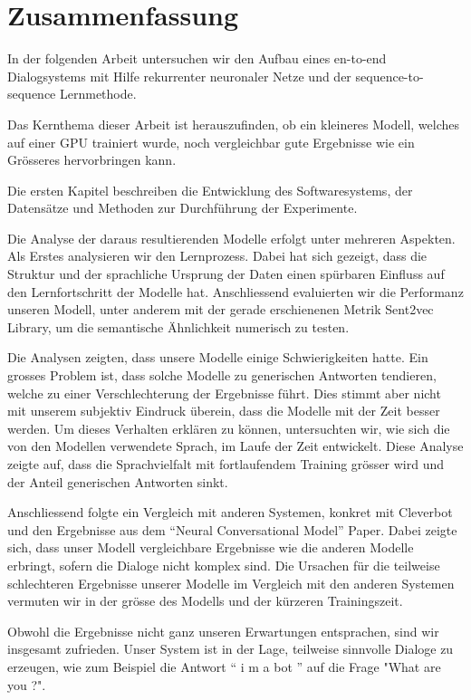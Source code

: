 \chapter*{Zusammenfassung}
In der folgenden Arbeit untersuchen wir den Aufbau eines en-to-end Dialogsystems mit Hilfe rekurrenter neuronaler Netze und der sequence-to-sequence Lernmethode.

Das Kernthema dieser Arbeit ist herauszufinden, ob ein kleineres Modell, welches auf einer GPU trainiert wurde, noch vergleichbar gute Ergebnisse wie ein Grösseres hervorbringen kann.

Die ersten Kapitel beschreiben die Entwicklung des Softwaresystems, der Datensätze und Methoden zur Durchführung der Experimente.

Die Analyse der daraus resultierenden Modelle erfolgt unter mehreren Aspekten. Als Erstes analysieren wir den Lernprozess. Dabei hat sich gezeigt, dass die Struktur und der sprachliche Ursprung der Daten einen spürbaren Einfluss auf den Lernfortschritt der Modelle hat. Anschliessend evaluierten wir die Performanz unseren Modell, unter anderem mit der gerade erschienenen Metrik Sent2vec Library, um die semantische Ähnlichkeit numerisch zu testen.

Die Analysen zeigten, dass unsere Modelle einige Schwierigkeiten hatte. Ein grosses Problem ist, dass solche Modelle zu generischen Antworten tendieren, welche zu einer Verschlechterung der Ergebnisse führt. Dies stimmt aber nicht mit unserem subjektiv Eindruck überein, dass die Modelle mit der Zeit besser werden. Um dieses Verhalten erklären zu können, untersuchten wir, wie sich die von den Modellen verwendete Sprach, im Laufe der Zeit entwickelt. Diese Analyse zeigte auf, dass die Sprachvielfalt mit fortlaufendem Training grösser wird und der Anteil generischen Antworten sinkt.

Anschliessend folgte ein Vergleich mit anderen Systemen, konkret mit Cleverbot und den Ergebnisse aus dem ``Neural Conversational Model'' Paper. Dabei zeigte sich, dass unser Modell vergleichbare Ergebnisse wie die anderen Modelle erbringt, sofern die Dialoge nicht komplex sind. Die Ursachen für die teilweise schlechteren Ergebnisse unserer Modelle im Vergleich mit den anderen Systemen vermuten wir in der grösse des Modells und der kürzeren Trainingszeit.

Obwohl die Ergebnisse nicht ganz unseren Erwartungen entsprachen, sind wir insgesamt zufrieden. Unser System ist in der Lage, teilweise sinnvolle Dialoge zu erzeugen, wie zum Beispiel die Antwort  `` i m a bot '' auf die Frage "What are you ?". 